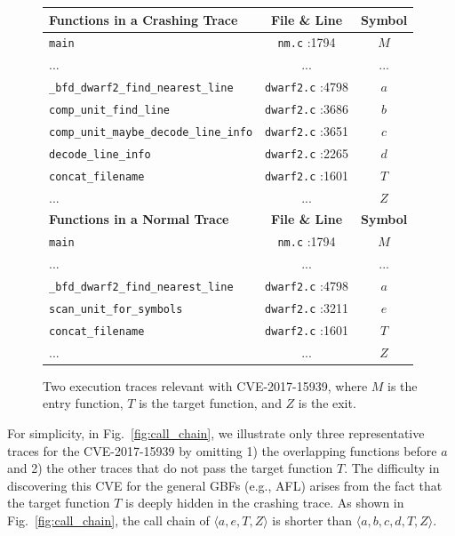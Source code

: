 \begin{figure}[t]
	\centering
	\small \begin{tabular}{lcc}
		\hline
  \textbf{Functions in a Crashing Trace} &  	\textbf{File \& Line} & \textbf{Symbol} \\\hline
  	 \texttt{main}   &   \texttt{nm.c} :1794     & \textsf{$M$}\\
 	   ... &  ...  &...  \\
 	 \texttt{\_bfd\_dwarf2\_find\_nearest\_line}     &   \texttt{dwarf2.c} :4798   &  \textsf{$a$}\\
 	 \texttt{comp\_unit\_find\_line}    &   \texttt{dwarf2.c} :3686    & \textsf{$b$}\\
 	 \texttt{comp\_unit\_maybe\_decode\_line\_info} &	 \texttt{dwarf2.c} :3651       &  \textsf{$c$}\\
  	 \texttt{decode\_line\_info}   &    \texttt{dwarf2.c} :2265     &  \textsf{$d$} \\
\texttt{concat\_filename}   &   \texttt{dwarf2.c} :1601     &  \textsf{$T$}\\
    ... 	 	  &     ... 	  &  \textsf{$Z$}\\\hline
	  \textbf{Functions in a Normal Trace} &  	\textbf{File \& Line} & \textbf{Symbol} \\\hline
	   \texttt{main}   &   \texttt{nm.c} :1794     &  \textsf{$M$}\\
	      ... &  ...  &...  \\
	   \texttt{\_bfd\_dwarf2\_find\_nearest\_line}     & \texttt{dwarf2.c} :4798      & \textsf{$a$}\\
	  \texttt{scan\_unit\_for\_symbols}    &      \texttt{dwarf2.c} :3211        &  \textsf{$e$}\\
  \texttt{concat\_filename}   &  \texttt{dwarf2.c} :1601      &  \textsf{$T$}\\
	    ... 	 	  &     ...       & \textsf{$Z$}\\\hline
	\end{tabular}
\vspace{-5pt}
	\caption{Two execution traces relevant with CVE-2017-15939, where $M$ is the entry function, $T$ is the target function, and $Z$ is the exit.}
	\label{fig:exam_trace}
\end{figure}



For simplicity, in Fig.~\ref{fig:call_chain}, we illustrate only three representative traces for the CVE-2017-15939 by omitting 1) the overlapping functions before $a$ and 2) the other traces that do not pass the target function $T$. {The difficulty in discovering this CVE for the general GBFs (e.g., AFL) arises from the fact that the target function $T$ is deeply hidden in the crashing trace.} As shown in Fig.~\ref{fig:call_chain}, the call chain of $\langle a, e, T, Z\rangle$ is shorter than $\langle a, b, c, d, T, Z\rangle$.

